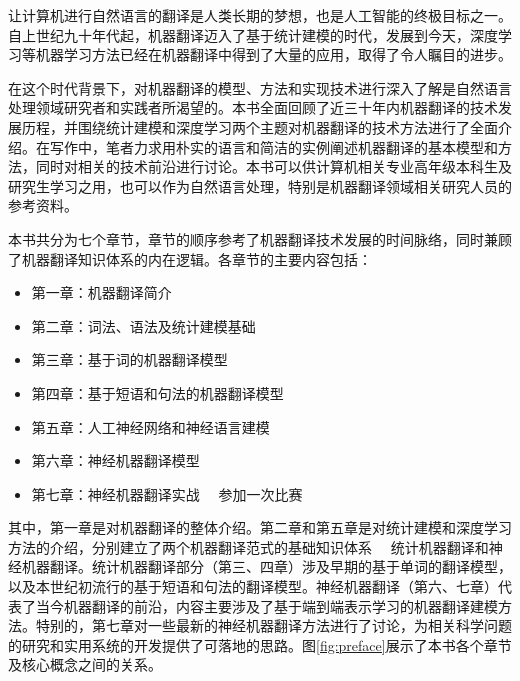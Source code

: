 \begin{spacing}{1.18}

让计算机进行自然语言的翻译是人类长期的梦想，也是人工智能的终极目标之一。自上世纪九十年代起，机器翻译迈入了基于统计建模的时代，发展到今天，深度学习等机器学习方法已经在机器翻译中得到了大量的应用，取得了令人瞩目的进步。

在这个时代背景下，对机器翻译的模型、方法和实现技术进行深入了解是自然语言处理领域研究者和实践者所渴望的。本书全面回顾了近三十年内机器翻译的技术发展历程，并围绕统计建模和深度学习两个主题对机器翻译的技术方法进行了全面介绍。在写作中，笔者力求用朴实的语言和简洁的实例阐述机器翻译的基本模型和方法，同时对相关的技术前沿进行讨论。本书可以供计算机相关专业高年级本科生及研究生学习之用，也可以作为自然语言处理，特别是机器翻译领域相关研究人员的参考资料。

本书共分为七个章节，章节的顺序参考了机器翻译技术发展的时间脉络，同时兼顾了机器翻译知识体系的内在逻辑。各章节的主要内容包括：

\begin{itemize}
\vspace{0.5em}
\item 第一章：机器翻译简介
\vspace{0.5em}
\item 第二章：词法、语法及统计建模基础
\vspace{0.5em}
\item 第三章：基于词的机器翻译模型
\vspace{0.5em}
\item 第四章：基于短语和句法的机器翻译模型
\vspace{0.5em}
\item 第五章：人工神经网络和神经语言建模
\vspace{0.5em}
\item 第六章：神经机器翻译模型
\vspace{0.5em}
\item 第七章：神经机器翻译实战 \ \dash \ 参加一次比赛
\vspace{0.5em}
\end{itemize}

其中，第一章是对机器翻译的整体介绍。第二章和第五章是对统计建模和深度学习方法的介绍，分别建立了两个机器翻译范式的基础知识体系 \ \dash \ 统计机器翻译和神经机器翻译。统计机器翻译部分（第三、四章）涉及早期的基于单词的翻译模型，以及本世纪初流行的基于短语和句法的翻译模型。神经机器翻译（第六、七章）代表了当今机器翻译的前沿，内容主要涉及了基于端到端表示学习的机器翻译建模方法。特别的，第七章对一些最新的神经机器翻译方法进行了讨论，为相关科学问题的研究和实用系统的开发提供了可落地的思路。图\ref{fig:preface}展示了本书各个章节及核心概念之间的关系。


\end{spacing}
